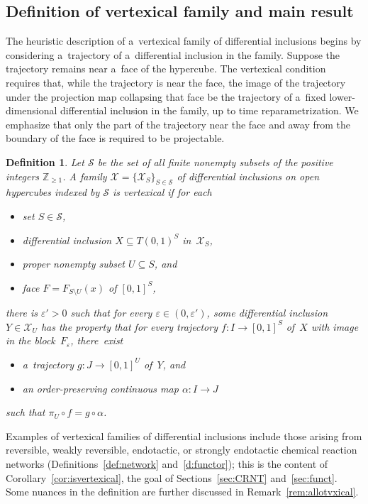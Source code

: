 \documentclass[11pt]{article}
\newtheorem{Definition}[Theorem]{Definition}
\begin{document}
\subsection{Definition of vertexical family and main result}
\label{sub:main}

The heuristic description of a~vertexical family of dif\/ferential inclusions begins by considering a~trajectory of
a~dif\/ferential inclusion in the family.
Suppose the trajectory remains near a~face of the hypercube.
The vertexical condition requires that, while the trajectory is near the face, the image of the trajectory under the
projection map collapsing that face be the trajectory of a~f\/ixed lower-dimensional dif\/ferential inclusion in the
family, up to time reparametrization.
We emphasize that only the part of the trajectory near the face and away from the boundary of the face is required to
be projectable.
\begin{Definition}\label{d:vertexical}
Let $\mathcal S$ be the set of all f\/inite nonempty subsets of the positive integers $\mathbb{Z}_{\geq1}$.
A family $\mathcal X=\{\mathcal X_S\}_{S\in\mathcal S}$ of dif\/ferential inclusions on open hypercubes indexed by
$\mathcal S$ is \emph{vertexical} if for each
\begin{itemize}\itemsep=-0.5pt
\item set $S\in\mathcal S$, \item dif\/ferential inclusion $X\subseteq T(0,1)^S$ in~$\mathcal X_S$, \item proper
nonempty subset $U\subseteq S$, and \item face $F=F_{S\setminus U}(x)$ of $[0,1]^S$,
\end{itemize}
there is $\varepsilon'>0$ such that for every $\varepsilon\in(0,\varepsilon')$, some dif\/ferential inclusion
$Y\in\mathcal X_U$ has the property that for every trajectory $f:I\to[0,1]^S$ of~$X$ with image in the
block~$F_\varepsilon$, there~exist
\begin{itemize}\itemsep=0pt
\item a~trajectory $g:J\to[0,1]^U$ of~$Y$, and \item an order-preserving continuous map $\alpha:I\to J$
\end{itemize}
such that $\pi_U\circ f=g\circ\alpha$.
\end{Definition}

Examples of vertexical families of dif\/ferential inclusions include those arising from reversible, weakly reversible,
endotactic, or strongly endotactic chemical reaction networks  (Def\/initions~\ref{def:network} and~\ref{d:functor});
this is the content of Corollary~\ref{cor:isvertexical}, the goal of Sections~\ref{sec:CRNT} and~\ref{sec:funct}.
Some nuances in the def\/inition are further discussed in Remark~\ref{rem:allotvxical}.
\end{document}
